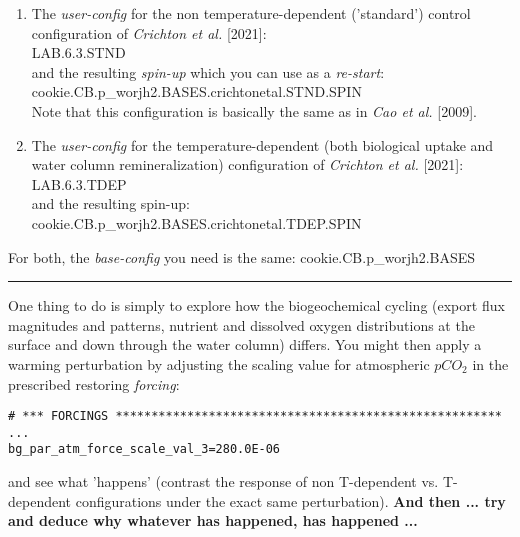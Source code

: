 \begin{enumerate}[noitemsep]
\vspace{1mm}
\item The \textit{user-config} for the non temperature-dependent ('standard') control configuration of \textit{Crichton et al.} [2021]:
\\\textsf{\footnotesize LAB.6.3.STND} 
\\and the resulting \textit{spin-up} which you can use as a \textit{re-start}: 
\\\textsf{\footnotesize cookie.CB.p\_worjh2.BASES.crichtonetal.STND.SPIN}
\\Note that this configuration is basically the same as in \textit{Cao et al.} [2009].
\vspace{1mm}
\item The \textit{user-config} for the temperature-dependent (both biological uptake and water column remineralization) configuration of \textit{Crichton et al.} [2021]:
\\\textsf{\footnotesize LAB.6.3.TDEP} 
\\and the resulting spin-up: 
\\\textsf{\footnotesize cookie.CB.p\_worjh2.BASES.crichtonetal.TDEP.SPIN}
\end{enumerate}

\vspace{1mm}
For both, the \textit{base-config} you need is the same: \textsf{\footnotesize cookie.CB.p\_worjh2.BASES}

\vspace{1mm} \noindent\rule{4cm}{0.1mm} \vspace{2mm}

\noindent One thing to do is simply to explore how the biogeochemical cycling (export flux magnitudes and patterns, nutrient and dissolved oxygen distributions at the surface and down through the water column) differs. You might then apply a warming perturbation by adjusting the scaling value for atmospheric \(pCO_{2}\) in the prescribed restoring \textit{forcing}:

\vspace{-2mm}\small\begin{verbatim}
# *** FORCINGS ******************************************************
...
bg_par_atm_force_scale_val_3=280.0E-06
\end{verbatim}\normalsize\vspace{-2mm}
and see what 'happens' (contrast the response of non T-dependent vs. T-dependent configurations under the exact same perturbation). \textbf{And then ... try and deduce why whatever has happened, has happened ...}

